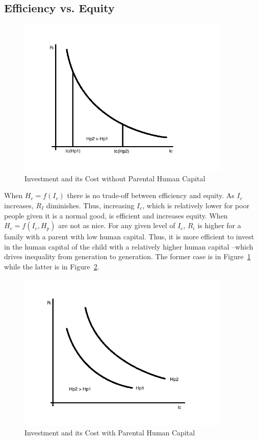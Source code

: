 \subsection{Efficiency vs. Equity}

\begin{center}
\begin{figure}[H] 
\caption{Investment and its Cost without Parental Human Capital}
\label{fig:effeq}
\centering
\includegraphics[width=4in, height=3in]{Plots/EffEq.png}
\end{figure}
\end{center}

\noindent When $H_{c} = f(I_{c})$ there is no trade-off between efficiency and equity. As $I_{c}$ increases, $R_{I}$ diminishes. Thus, increasing $I_{c}$, which is relatively lower for poor people given it is a normal good, is efficient and increases equity. When $H_{c} = f(I_{c}, H_{p})$ are not as nice. For any given level of $I_{c}$, $R_{i}$ is higher for a family with a parent with low human capital. Thus, it is more efficient to invest in the human capital of the child with a relatively higher human capital --which drives inequality from generation to generation. The former case is in Figure~\ref{fig:effeq} while the latter is in Figure~\ref{fig:effeff}. 

\begin{center}
\begin{figure}[H] 
\caption{Investment and its Cost with Parental Human Capital}
\label{fig:effeff}
\centering
\includegraphics[width=4in, height=3in]{Plots/EffEff.png}
\end{figure}
\end{center}

